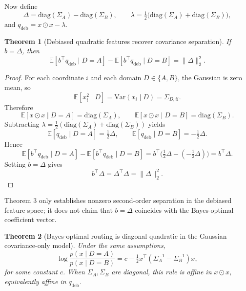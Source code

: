 \documentclass[11pt]{article}
\newtheorem{theorem}{Theorem}
\begin{document}
Now define
\[
\Delta = \mathrm{diag}(\Sigma_A)-\mathrm{diag}(\Sigma_B),
\qquad
\lambda = \tfrac{1}{2}\big(\mathrm{diag}(\Sigma_A)+\mathrm{diag}(\Sigma_B)\big),
\]
and $q_{\mathrm{deb}} = x\odot x - \lambda$.

\begin{theorem}[Debiased quadratic features recover covariance separation]
If $b=\Delta$, then
\[
\mathbb{E}[b^\top q_{\mathrm{deb}}\mid D=A]
-
\mathbb{E}[b^\top q_{\mathrm{deb}}\mid D=B]
=
\|\Delta\|_2^2.
\]
\end{theorem}

\begin{proof}
For each coordinate $i$ and each domain $D\in\{A,B\}$, the Gaussian is zero mean, so
\[
\mathbb{E}[x_i^2\mid D]
=
\mathrm{Var}(x_i\mid D)
=
\Sigma_{D,ii}.
\]
Therefore
\[
\mathbb{E}[x\odot x\mid D=A]=\mathrm{diag}(\Sigma_A),
\qquad
\mathbb{E}[x\odot x\mid D=B]=\mathrm{diag}(\Sigma_B).
\]
Subtracting $\lambda=\tfrac12(\mathrm{diag}(\Sigma_A)+\mathrm{diag}(\Sigma_B))$ yields
\[
\mathbb{E}[q_{\mathrm{deb}}\mid D=A]=\tfrac{1}{2}\Delta,
\qquad
\mathbb{E}[q_{\mathrm{deb}}\mid D=B]=-\tfrac{1}{2}\Delta.
\]
Hence
\[
\mathbb{E}[b^\top q_{\mathrm{deb}}\mid D=A]
-
\mathbb{E}[b^\top q_{\mathrm{deb}}\mid D=B]
=
b^\top\Big(\tfrac12\Delta-(-\tfrac12\Delta)\Big)
=
b^\top \Delta.
\]
Setting $b=\Delta$ gives
\[
b^\top \Delta
=
\Delta^\top \Delta
=
\|\Delta\|_2^2.
\]
\end{proof}

Theorem 3 only establishes nonzero second-order separation in the debiased feature space; it does not claim that $b = \Delta$ coincides with the Bayes-optimal coefficient vector.

\begin{theorem}[Bayes-optimal routing is diagonal quadratic in the Gaussian covariance-only model]
Under the same assumptions,
\[
\log \frac{p(x\mid D=A)}{p(x\mid D=B)}
=
c-\tfrac{1}{2}x^\top(\Sigma_A^{-1}-\Sigma_B^{-1})x,
\]
for some constant $c$. When $\Sigma_A,\Sigma_B$ are diagonal, this rule is affine in $x\odot x$, equivalently affine in $q_{\mathrm{deb}}$.
\end{theorem}
\end{document}
